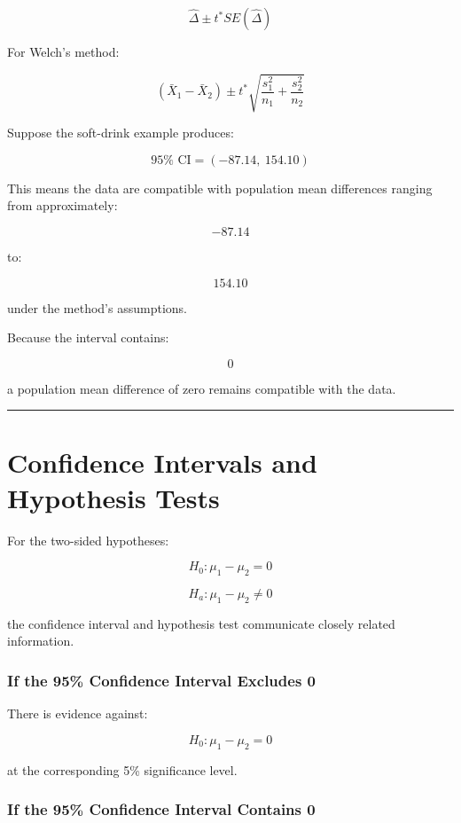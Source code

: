 \documentclass[
  letterpaper,
  DIV=11,
  numbers=noendperiod]{scrreprt}
\begin{document}
\[
\boxed{
\hat{\Delta}
\pm
t^*SE(\hat{\Delta})
}
\]

For Welch's method:

\[
\boxed{
(\bar{X}_1-\bar{X}_2)
\pm
t^*
\sqrt{
\frac{s_1^2}{n_1}
+
\frac{s_2^2}{n_2}
}
}
\]

Suppose the soft-drink example produces:

\[
95\%\text{ CI}
=
(-87.14,\ 154.10)
\]

This means the data are compatible with population mean differences
ranging from approximately:

\[
-87.14
\]

to:

\[
154.10
\]

under the method's assumptions.

Because the interval contains:

\[
0
\]

a population mean difference of zero remains compatible with the data.

\begin{center}\rule{0.5\linewidth}{0.5pt}\end{center}


\chapter{Confidence Intervals and Hypothesis
Tests}\label{confidence-intervals-and-hypothesis-tests}

For the two-sided hypotheses:

\[
H_0:\mu_1-\mu_2=0
\]

\[
H_a:\mu_1-\mu_2\neq0
\]

the confidence interval and hypothesis test communicate closely related
information.

\subsection{If the 95\% Confidence Interval Excludes
0}\label{if-the-95-confidence-interval-excludes-0}

There is evidence against:

\[
H_0:\mu_1-\mu_2=0
\]

at the corresponding 5\% significance level.

\subsection{If the 95\% Confidence Interval Contains
0}\label{if-the-95-confidence-interval-contains-0}
\end{document}
